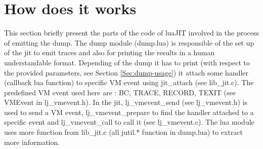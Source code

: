 \section{How does it works}
\label{Sec:dump-internals}

This section briefly present the parts of the code of luaJIT involved in the process of
emitting the dump. The dump module (dump.lua) is responsible of the set up of the
jit to emit traces and also for printing the results in a human understandable
format. Depending of the dump it has to print (with respect to the provided
parameters, see Section \ref{Sec:dump-usage}) it attach some handler
(callback lua function) to specific VM event using jit\_attach (see lib\_jit.c).
The predefined VM event used here are : BC, TRACE, RECORD, TEXIT
(see VMEvent in lj\_vmevent.h). In the jit, lj\_vmevent\_send (see lj\_vmevent.h)
is used to send a VM event, lj\_vmevent\_prepare to find the handler attached to a
specific event and lj\_vmevent\_call to call it (see lj\_vmevent.c).
The lua module uses more function from lib\_jit.c (all jutil.* function
in dump.lua) to extract more information.
